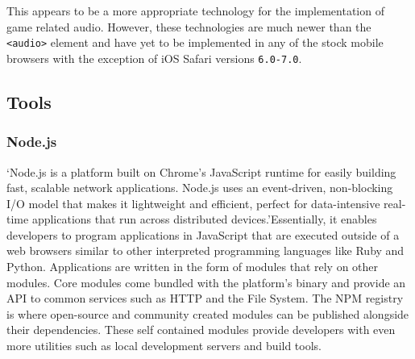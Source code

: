 \documentclass[final]{cmpreport}
\begin{document}

This appears to be a more appropriate technology for the implementation of game related audio. However, these technologies are much newer than the \texttt{<audio>} element and have yet to be implemented in any of the stock mobile browsers with the exception of iOS Safari versions \texttt{6.0-7.0\footnotemark}.


\subsection{Tools}

\subsubsection{Node.js}
`Node.js is a platform built on Chrome's JavaScript runtime for easily building fast, scalable network applications. Node.js uses an event-driven, non-blocking I/O model that makes it lightweight and efficient, perfect for data-intensive real-time applications that run across distributed devices.'\footnotemark Essentially, it enables developers to program applications in JavaScript that are executed outside of a web browsers similar to other interpreted programming languages like Ruby and Python. Applications are written in the form of modules that rely on other modules. Core modules come bundled with the platform's binary and provide an API to common services such as HTTP and the File System. The NPM registry is where open-source and community created modules can be published alongside their dependencies. These self contained modules provide developers with even more utilities such as local development servers and build tools.

\end{document}
